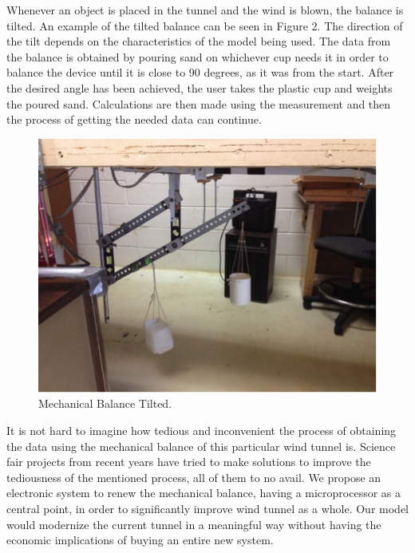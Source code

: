 		Whenever an object is placed in the tunnel and the wind is blown, the balance is tilted. An
		example of the tilted balance can be seen in Figure 2. The direction of the tilt depends 
		on the characteristics of the model being used. The data from the balance is obtained 
		by pouring sand on whichever cup needs it in order to balance the device until 
		it is close to 90 degrees, as it was from the start. After the desired angle has been 
		achieved, the user takes the plastic cup and weights the poured sand. Calculations are 
		then made using the measurement and then the process of getting the needed data can continue.

		
		\begin{figure}[H]
			\centering
				\includegraphics[scale=0.7]{img/intro-2}
			\caption{Mechanical Balance Tilted.}
		\end{figure}

		It is not hard to imagine how tedious and inconvenient the process of obtaining the data using
		the mechanical balance of this particular wind tunnel is. Science fair projects from recent
		years have tried to make solutions to improve the tediousness of the mentioned process, all of 
		them to no avail. We propose an electronic system to renew the mechanical balance, having a 
		microprocessor as a central point, in order to significantly improve wind tunnel as a whole.
		Our model would modernize the current tunnel in a meaningful way without having the economic
		implications of buying an entire new system.